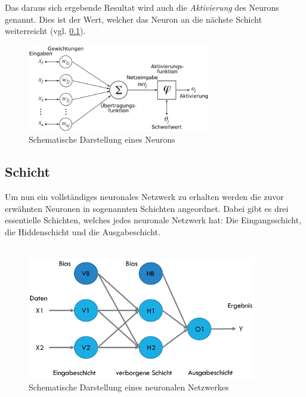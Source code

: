 Das daraus sich ergebende Resultat wird auch die \emph{Aktivierung} des Neurons genannt. Dies ist der Wert, welcher das Neuron an die nächste Schicht weiterreicht (vgl. \ref{basic:neural_network:layer}).

\begin{figure}
	\centering
	\includegraphics[width=8cm]{img/neuron}
	\caption{Schematische Darstellung eines Neurons}
\end{figure}

\subsection{Schicht}
\label{basic:neural_network:layer}

Um nun ein vollständiges neuronales Netzwerk zu erhalten werden die zuvor erwähnten Neuronen in sogenannten Schichten angeordnet. Dabei gibt es drei essentielle Schichten, welches jedes neuronale Netzwerk hat: Die Eingangsschicht, die Hiddenschicht und die Ausgabeschicht.\\\\

\begin{figure}[h]
	\centering
	\includegraphics[width=10cm]{img/basic_neural_network}
	\caption{Schematische Darstellung eines neuronalen Netzwerkes}
\end{figure}

